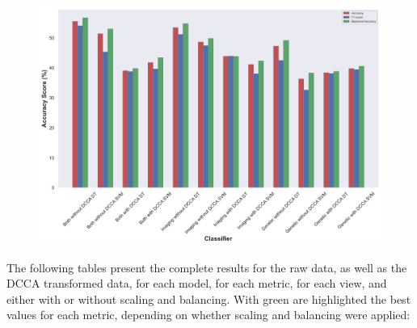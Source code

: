 {%

\begin{figure}[H]
    \centering
    \includegraphics[width=\textwidth]{figures/Results/RAW/AdaBoost_RAW_with.png}
    \caption[]{}
\end{figure}


The following tables present the complete results for the raw data, as well as the DCCA transformed data, for each model, for each metric, for each view, and either with or without scaling and balancing. With green are highlighted the best values for each metric, depending on whether scaling and balancing were applied:

}
